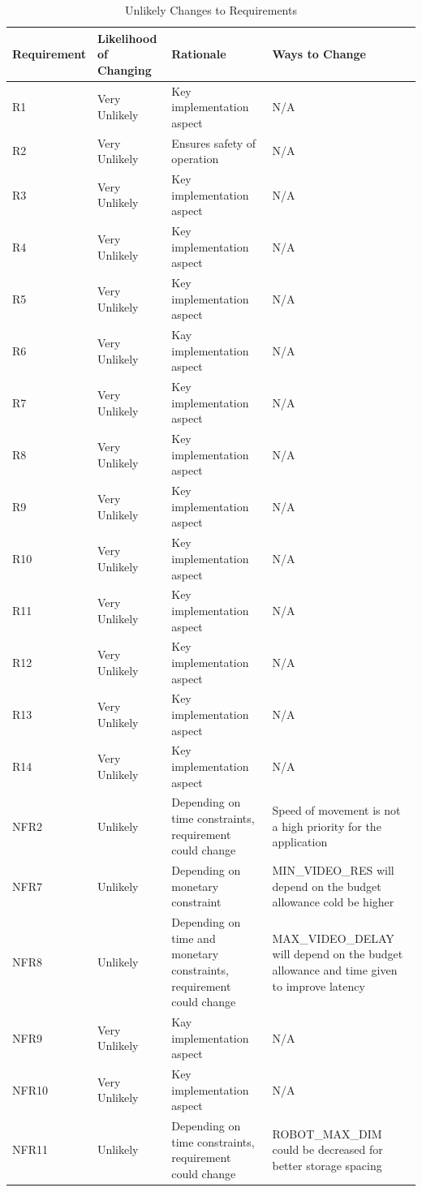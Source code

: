 \documentclass[12pt]{article}
\begin{document}
\begin{longtable}{ | p{2.3cm} | p{3.0cm} | p{4cm} | p{4cm} |}
\caption{Unlikely Changes to Requirements}
\label{Table:Unlikely}\\
\hline
Requirement & Likelihood of Changing & Rationale & Ways to Change \\
\hline
R1 & Very Unlikely & Key implementation aspect & N/A \\
\hline
R2 & Very Unlikely & Ensures safety of operation & N/A \\ 
\hline
R3 & Very Unlikely & Key implementation aspect & N/A \\
\hline
R4 & Very Unlikely & Key implementation aspect & N/A \\
\hline
R5 & Very Unlikely & Key implementation aspect & N/A \\
\hline
R6 & Very Unlikely & Kay implementation aspect & N/A \\
\hline
R7 & Very Unlikely & Key implementation aspect & N/A \\
\hline
R8 & Very Unlikely & Key implementation aspect & N/A \\
\hline
R9 & Very Unlikely & Key implementation aspect & N/A \\
\hline
R10 & Very Unlikely & Key implementation aspect & N/A \\
\hline
R11 & Very Unlikely & Key implementation aspect & N/A \\
\hline
R12 & Very Unlikely & Key implementation aspect & N/A \\
\hline
R13 & Very Unlikely & Key implementation aspect & N/A \\
\hline
R14 & Very Unlikely & Key implementation aspect & N/A \\
\hline
NFR2 & Unlikely & Depending on time constraints, requirement could change & Speed of movement is not a high priority  for the application \\
\hline
NFR7 & Unlikely & Depending on monetary constraint & MIN\_VIDEO\_RES will depend on the budget allowance cold be higher \\
\hline
NFR8 & Unlikely & Depending on time and monetary constraints, requirement could change & MAX\_VIDEO\_DELAY will depend on the budget allowance and time given to improve latency \\
\hline
NFR9 & Very Unlikely & Kay implementation aspect & N/A \\
\hline
NFR10 & Very Unlikely & Key implementation aspect & N/A \\
\hline
NFR11 & Unlikely & Depending on time constraints, requirement could change & ROBOT\_MAX\_DIM could be decreased for better storage spacing \\

\end{longtable}
\end{document}
